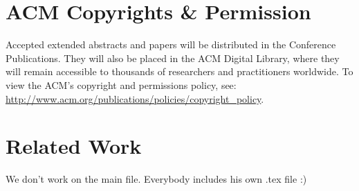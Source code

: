 \documentclass[sigchi-a, authorversion]{acmart}
\begin{document}
\section{ACM Copyrights \& Permission}
Accepted extended abstracts and papers will be distributed in the
Conference Publications. They will also be placed in the ACM Digital
Library, where they will remain accessible to thousands of researchers
and practitioners worldwide. To view the ACM's copyright and
permissions policy, see:
\url{http://www.acm.org/publications/policies/copyright_policy}.


\section{Related Work}
We don't work on the main file. Everybody includes his own .tex file :)
 
 







\end{document}
